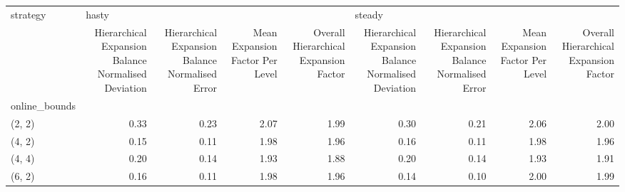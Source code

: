 \begin{tabular}{lrrrrrrrr}
\toprule
strategy & \multicolumn{4}{l}{hasty} & \multicolumn{4}{l}{steady} \\
{} & Hierarchical Expansion Balance Normalised Deviation & Hierarchical Expansion Balance Normalised Error & Mean Expansion Factor Per Level & Overall Hierarchical Expansion Factor & Hierarchical Expansion Balance Normalised Deviation & Hierarchical Expansion Balance Normalised Error & Mean Expansion Factor Per Level & Overall Hierarchical Expansion Factor \\
online\_bounds &                                                     &                                                 &                                 &                                       &                                                     &                                                 &                                 &                                       \\
\midrule
(2, 2)        &                                               0.33 &                                            0.23 &                            2.07 &                                  1.99 &                                               0.30 &                                            0.21 &                            2.06 &                                  2.00 \\
(4, 2)        &                                               0.15 &                                            0.11 &                            1.98 &                                  1.96 &                                               0.16 &                                            0.11 &                            1.98 &                                  1.96 \\
(4, 4)        &                                               0.20 &                                            0.14 &                            1.93 &                                  1.88 &                                               0.20 &                                            0.14 &                            1.93 &                                  1.91 \\
(6, 2)        &                                               0.16 &                                            0.11 &                            1.98 &                                  1.96 &                                               0.14 &                                            0.10 &                            2.00 &                                  1.99 \\

\end{tabular}
